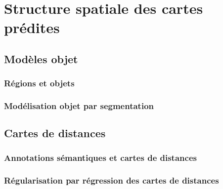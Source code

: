 \chapter{Structure spatiale des cartes prédites}

\section{Modèles objet}

\subsection{Régions et objets}

\subsection{Modélisation objet par segmentation}

\section{Cartes de distances}

\subsection{Annotations sémantiques et cartes de distances}

\subsection{Régularisation par régression des cartes de distances}

